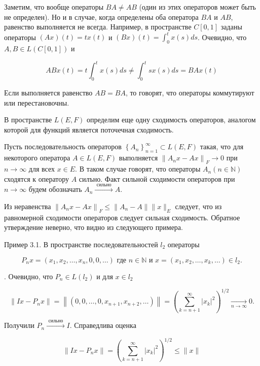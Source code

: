 \documentclass[a4paper, 12pt]{extarticle}
\begin{document}
Заметим, что вообще операторы $B A \neq A B$ (один из этих операторов может быть не определен). Но и в случае, когда определены оба оператора $B A$ и $A B$, равенство выполняется не всегда. Например, в пространстве $C[0,1]$ заданы операторы $(A x)(t)=t x(t)$ и $(B x)(t)=\int_{0}^{t} x(s) d s$. Очевидно, что $A, B \in L(C[0,1])$ и

$$
	A B x(t)=t \int_{0}^{t} x(s) d s \neq \int_{0}^{t} s x(s) d s=B A x(t)
$$

Если выполняется равенство $A B=B A$, то говорят, что операторы коммутируют или перестановочны.

В пространстве $L(E, F)$ определим еще одну сходимость операторов, аналогом которой для функций является поточечная сходимость.

Пусть последовательность операторов $\left\{A_{n}\right\}_{n=1}^{\infty} \subset L(E, F)$ такая, что для некоторого оператора $A \in L(E, F)$ выполняется $\left\|A_{n} x-A x\right\|_{F} \rightarrow 0$ при $n \rightarrow \infty$ для всех $x \in E$. В таком случае говорят, что операторы $A_{n}(n \in \mathbb{N})$ сходятся к оператору $A$ силъно. Факт сильной сходимости операторов при $n \rightarrow \infty$ будем обозначать $A_{n} \stackrel{\text { сильно }}{\longrightarrow} A$.

Из неравенства $\left\|A_{n} x-A x\right\|_{F} \leq\left\|A_{n}-A\right\|\|x\|_{E}$ следует, что из равномерной сходимости операторов следует сильная сходимость. Обратное утверждение неверно, что видно из следующего примера.

Пример 3.1. В пространстве последовательностей $l_{2}$ операторы

$$
	P_{n} x=\left(x_{1}, x_{2}, \ldots, x_{n}, 0,0, \ldots\right) \text { где } n \in \mathbb{N} \text { и } x=\left(x_{1}, x_{2}, \ldots, x_{k}, \ldots\right) \in l_{2} .
$$

. Очевидно, что $P_{n} \in L\left(l_{2}\right)$ и для $x \in l_{2}$

$$
	\left\|I x-P_{n} x\right\|=\left\|\left(0,0, \ldots, 0, x_{n+1}, x_{n+2}, \ldots\right)\right\|=\left(\sum_{k=n+1}^{\infty}\left|x_{k}\right|^{2}\right)^{1 / 2} \underset{n \rightarrow \infty}{\longrightarrow} 0 .
$$

Получили $P_{n} \stackrel{\text { сильно }}{\longrightarrow} I$. Справедлива оценка

$$
	\left\|I x-P_{n} x\right\|=\left(\sum_{k=n+1}^{\infty}\left|x_{k}\right|^{2}\right)^{1 / 2} \leq\|x\|
$$
\end{document}
